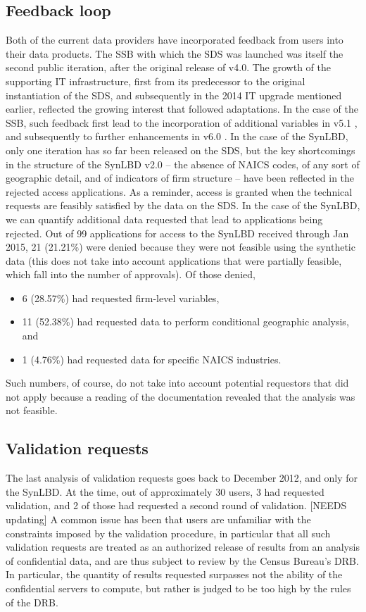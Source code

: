 \documentclass[12pt,titlepage]{article}
\begin{document}
\subsection{Feedback loop}
Both of the current data providers have incorporated feedback from users into their data products. The \ac{SSB} with which the \ac{SDS} was launched was itself the second public iteration, after the original release of v4.0. The growth of the supporting IT infrastructure, first from its predecessor to the original instantiation of the \ac{SDS}, and subsequently in the 2014 IT upgrade mentioned earlier, reflected the growing interest that followed adaptations. In the case of the \ac{SSB}, such feedback first lead to the incorporation of additional variables in v5.1 \citep{SSB5.1}, and subsequently to further enhancements in v6.0 \citep{SSB6}. 
In the case of the \ac{SynLBD}, only one iteration has so far been released on the \ac{SDS}, but the key shortcomings in the structure of the SynLBD v2.0 \citep{SynLBD20} -- the absence of \ac{NAICS} codes, of any sort of geographic detail, and of indicators of firm structure -- have been reflected in the rejected access applications. 
As a reminder, access is granted when the technical requests are feasibly satisfied by the data on the \ac{SDS}. 
In the case of the SynLBD, we can quantify additional data requested that lead to applications being rejected. 
Out of 99 applications for access to the \ac{SynLBD} received through Jan 2015, 21 (21.21\%) were denied because they were not feasible using the synthetic data (this does not take into account applications that were partially feasible, which fall into the number of approvals). Of those denied, 
\begin{itemize}
\item 6 (28.57\%) had requested firm-level variables, 
\item 11 (52.38\%) had requested data to perform conditional geographic analysis, and
\item 1 (4.76\%) had requested data for specific \ac{NAICS} industries.
\end{itemize}
Such numbers, of course, do not take into account potential requestors that did not apply because a reading of the documentation revealed that the analysis was not feasible.

\subsection{Validation requests}

The last analysis of validation requests goes back to December 2012, and only for the \ac{SynLBD}. At the time, out of approximately 30 users, 3 had requested validation, and 2 of those had requested a second round of validation. [NEEDS updating] A common issue has been that users are unfamiliar with the constraints imposed by the validation procedure, in particular that all such validation requests are treated as an authorized release of results from an analysis of confidential data, and are thus subject to review by the Census Bureau's \ac{DRB}. In particular, the quantity of results requested surpasses not the ability of the confidential servers to compute, but rather is judged to be too high by the rules of the \ac{DRB}. 
\end{document}
